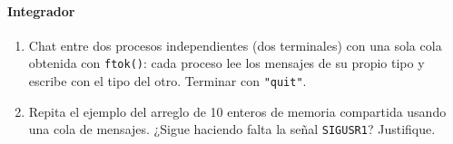 \documentclass[12pt,a4paper]{article}
\begin{document}
\paragraph{Integrador}
\begin{enumerate}[resume]
    \item Chat entre dos procesos independientes (dos terminales) con una sola cola obtenida con \texttt{ftok()}: cada proceso lee los mensajes de su propio tipo y escribe con el tipo del otro. Terminar con \texttt{"quit"}.
    \item Repita el ejemplo del arreglo de 10 enteros de memoria compartida usando una cola de mensajes. ¿Sigue haciendo falta la señal \texttt{SIGUSR1}? Justifique.
\end{enumerate}
\end{document}

